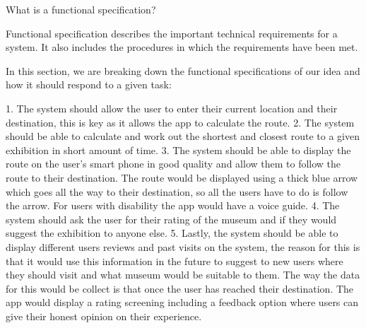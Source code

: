 

What is a functional specification?

Functional specification describes the important technical requirements for a system. It also includes the procedures in which the requirements have been met.

In this section, we are breaking down the functional specifications of our idea and how it should respond to a given task:



1.	The system should allow the user to enter their current location and their destination, this is key as it allows the app to calculate the route.
2.	The system should be able to calculate and work out the shortest and closest route to a given exhibition in short amount of time.
3.	The system should be able to display the route on the user’s smart phone in good quality and allow them to follow the route to their destination. The route would be displayed using a thick blue arrow which goes all the way to their destination, so all the users have to do is follow the arrow. For users with disability the app would have a voice guide.
4.	The system should ask the user for their rating of the museum and if they would suggest the exhibition to anyone else.
5.	Lastly, the system should be able to display different users reviews and past visits on the system, the reason for this is that it would use this information in the future to suggest to new users where they should visit and what museum would be suitable to them. The way the data for this would be collect is that once the user has reached their destination. The app would display a rating screening including a feedback option where users can give their honest opinion on their experience. 
